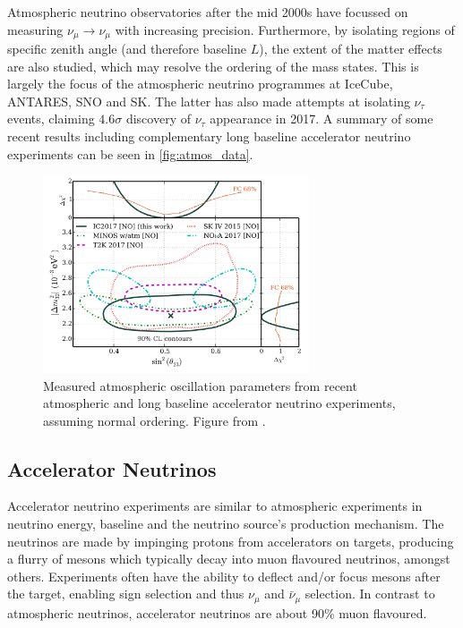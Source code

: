 Atmospheric neutrino observatories after the mid 2000s have focussed on measuring $\nu_\mu\rightarrow\nu_\mu$ with increasing precision. Furthermore, by isolating regions of specific zenith angle (and therefore baseline $L$), the extent of the matter effects are also studied, which may resolve the ordering of the mass states. This is largely the focus of the atmospheric neutrino programmes at IceCube\cite{icecube}, ANTARES\cite{antares}, SNO \cite{sno_atmos} and SK\cite{superk}. The latter has also made attempts at isolating $\nu_\tau$ events\cite{superk_tau}, claiming $4.6\sigma$ discovery of $\nu_\tau$ appearance in 2017. A summary of some recent results including complementary long baseline accelerator neutrino experiments can be seen in \autoref{fig:atmos_data}.
\begin{figure}[h]
	\includegraphics[width=0.7\textwidth, trim={0mm 0mm 0mm 0mm}, clip,page=1]{figures/theory/icecube_comp}
	\caption{Measured atmospheric oscillation parameters from recent atmospheric and long baseline accelerator neutrino experiments, assuming normal ordering. Figure from \cite{icecube}.}
	\label{fig:atmos_data}
\end{figure}

\subsection{Accelerator Neutrinos}
Accelerator neutrino experiments are similar to atmospheric experiments in neutrino energy, baseline and the neutrino source's production mechanism. The neutrinos are made by impinging protons from accelerators on targets, producing a flurry of mesons which typically decay into muon flavoured neutrinos, amongst others. Experiments often have the ability to deflect and/or focus mesons after the target, enabling sign selection and thus $\nu_\mu$ and $\bar{\nu}_\mu$ selection. In contrast to atmospheric neutrinos, accelerator neutrinos are about 90\% muon flavoured.

